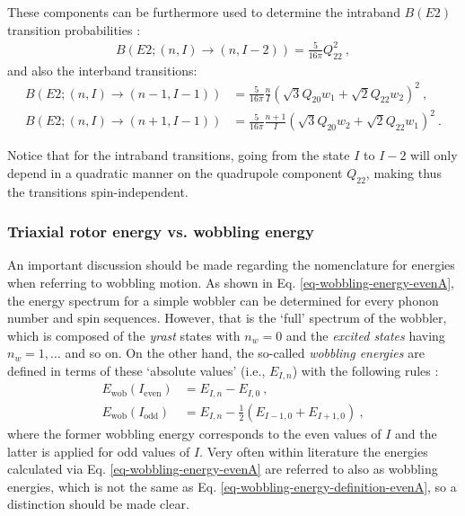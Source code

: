 These components can be furthermore used to determine the intraband $B(E2)$ transition probabilities \cite{wen2015wobbling}:
\begin{align}
    B(E2;(n,I)\to(n,I-2))=\frac{5}{16\pi}Q_{22}^2\ ,
    \label{intraband-probability-simple-wobbler}
\end{align}
and also the interband transitions:
\begin{align}
    B(E2;(n,I)\to(n-1,I-1))&=\frac{5}{16\pi}\frac{n}{I}\left(\sqrt{3}Q_{20}w_1+\sqrt{2}Q_{22}w_2\right)^2\ , \label{interband-probability-simple-wobbler-1}\\
    B(E2;(n,I)\to(n+1,I-1))&=\frac{5}{16\pi}\frac{n+1}{I}\left(\sqrt{3}Q_{20}w_2+\sqrt{2}Q_{22}w_1\right)^2\ .
    \label{interband-probability-simple-wobbler-2}
\end{align}

Notice that for the intraband transitions, going from the state $I$ to $I-2$ will only depend in a quadratic manner on the quadrupole component $Q_{22}$, making thus the transitions spin-independent.

\subsubsection*{Triaxial rotor energy vs. wobbling energy}

An important discussion should be made regarding the nomenclature for energies when referring to wobbling motion. As shown in Eq. \ref{eq-wobbling-energy-evenA}, the energy spectrum for a simple wobbler can be determined for every phonon number and spin sequences. However, that is the `full' spectrum  of the wobbler, which is composed of the \emph{yrast} states with $n_w=0$ and the \emph{excited states} having $n_w=1,\dots$ and so on. On the other hand, the so-called \emph{wobbling energies} are defined in terms of these `absolute values' (i.e., $E_{I,n}$) with the following rules \cite{wen2015wobbling}:
\begin{align}
    E_\text{wob}(I_\text{even})&=E_{I,n}-E_{I,0}\ ,\\
    E_\text{wob}(I_\text{odd})&=E_{I,n}-\frac{1}{2}\left(E_{I-1,0}+E_{I+1,0}\right)\ ,
    \label{eq-wobbling-energy-definition-evenA}
\end{align}
where the former wobbling energy corresponds to the even values of $I$ and the latter is applied for odd values of $I$. Very often within literature the energies calculated via Eq. \ref{eq-wobbling-energy-evenA} are referred to also as wobbling energies, which is not the same as Eq. \ref{eq-wobbling-energy-definition-evenA}, so a distinction should be made clear.

